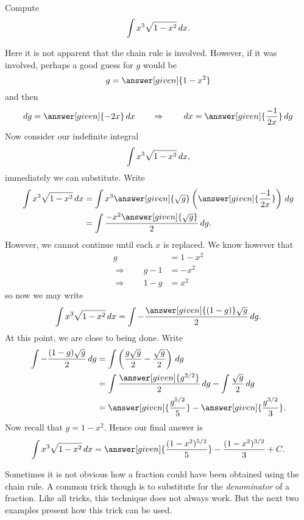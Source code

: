 \documentclass{ximera}
\begin{document}
\begin{example} Compute
\[
\int x^3\sqrt{1-x^2}\,d x.
\]
\begin{explanation}
Here it is not apparent that the chain rule is involved. However, if
it was involved, perhaps a good guess for $g$ would be
\[
g = \answer[given]{1-x^2}
\]
and then
\[
dg = \answer[given]{-2x} \d x 	\qquad	\Rightarrow	\qquad	\d x = \answer[given]{\frac{-1}{2x}} \d g
\]
Now consider our indefinite integral
\[
\int x^3\sqrt{1-x^2}\,d x,
\]
immediately we can substitute. Write
\begin{align*}
  \int x^3\sqrt{1-x^2}\d x &= \int x^3 \answer[given]{\sqrt{g}} \left( \answer[given]{\frac{-1}{2x}} \right) \d g \\
  &= \int \frac{-x^2 \answer[given]{\sqrt{g}}}{2}\d g.
\end{align*}
However, we cannot continue until each $x$ is replaced. We know however that 
\begin{align*}
g &= 1-x^2 \\
\Rightarrow \qquad g -1 &= -x^2\\
\Rightarrow \qquad 1- g &= x^2
\end{align*}
so now we may write
\[
\int x^3\sqrt{1-x^2}\d x = \int -\frac{\answer[given]{(1-g)} \sqrt{g}}{2}\d g.
\]
At this point, we are close to being done. Write
\begin{align*}
\int -\frac{(1-g)\sqrt{g}}{2}\d g &= \int \left(\frac{g\sqrt{g}}{2} - \frac{\sqrt{g}}{2}\right) \d g \\
&= \int \frac{\answer[given]{g^{3/2}}}{2} \d g - \int \frac{\sqrt{g}}{2} \d g \\
&= \answer[given]{\frac{g^{5/2}}{5}} - \answer[given]{\frac{g^{3/2}}{3}}.
\end{align*}
Now recall that $g = 1-x^2$. Hence our final answer is
\[
\int x^3\sqrt{1-x^2}\d x = \answer[given]{\frac{(1-x^2)^{5/2}}{5}} - \frac{(1-x^2)^{3/2}}{3}+C.
\]
\end{explanation}
\end{example}


Sometimes it is not obvious how a fraction could have been obtained using the chain rule.  
A common trick though is to substitute for the \textit{denominator} of a fraction.  
Like all tricks, this technique does not always work.  
But the next two examples present how this trick can be used.
\end{document}
